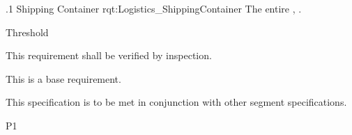 \ONERQMTV
{\RqtNumberBase.1}
{Shipping Container}
{rqt:Logistics_ShippingContainer}
{The entire \ThisSys, \TBD.}
{
	\item [Phase 1] Threshold
}
{This requirement shall be verified by inspection.}
{
\item [N/A] This is a base requirement.
}
{
	\item This specification is to be met in conjunction with other segment specifications.
}
{P1}

